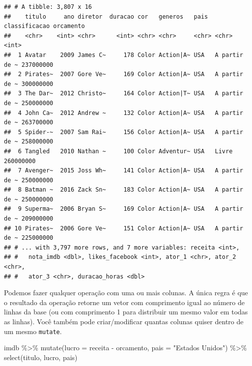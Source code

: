 \documentclass[
]{book}
\newenvironment{Shaded}{\begin{snugshade}}{\end{snugshade}}
\newcommand{\AttributeTok}[1]{\textcolor[rgb]{0.77,0.63,0.00}{#1}}
\newcommand{\FunctionTok}[1]{\textcolor[rgb]{0.00,0.00,0.00}{#1}}
\newcommand{\NormalTok}[1]{#1}
\newcommand{\SpecialCharTok}[1]{\textcolor[rgb]{0.00,0.00,0.00}{#1}}
\newcommand{\StringTok}[1]{\textcolor[rgb]{0.31,0.60,0.02}{#1}}
\begin{document}
\begin{verbatim}
## # A tibble: 3,807 x 16
##    titulo     ano diretor  duracao cor   generos   pais  classificacao orcamento
##    <chr>    <int> <chr>      <int> <chr> <chr>     <chr> <chr>             <int>
##  1 Avatar    2009 James C~     178 Color Action|A~ USA   A partir de ~ 237000000
##  2 Pirates~  2007 Gore Ve~     169 Color Action|A~ USA   A partir de ~ 300000000
##  3 The Dar~  2012 Christo~     164 Color Action|T~ USA   A partir de ~ 250000000
##  4 John Ca~  2012 Andrew ~     132 Color Action|A~ USA   A partir de ~ 263700000
##  5 Spider-~  2007 Sam Rai~     156 Color Action|A~ USA   A partir de ~ 258000000
##  6 Tangled   2010 Nathan ~     100 Color Adventur~ USA   Livre         260000000
##  7 Avenger~  2015 Joss Wh~     141 Color Action|A~ USA   A partir de ~ 250000000
##  8 Batman ~  2016 Zack Sn~     183 Color Action|A~ USA   A partir de ~ 250000000
##  9 Superma~  2006 Bryan S~     169 Color Action|A~ USA   A partir de ~ 209000000
## 10 Pirates~  2006 Gore Ve~     151 Color Action|A~ USA   A partir de ~ 225000000
## # ... with 3,797 more rows, and 7 more variables: receita <int>,
## #   nota_imdb <dbl>, likes_facebook <int>, ator_1 <chr>, ator_2 <chr>,
## #   ator_3 <chr>, duracao_horas <dbl>
\end{verbatim}

Podemos fazer qualquer operação com uma ou mais colunas. A única regra é que o resultado da operação retorne um vetor com comprimento igual ao número de linhas da base (ou com comprimento 1 para distribuir um mesmo valor em todas as linhas). Você também pode criar/modificar quantas colunas quiser dentro de um mesmo \texttt{mutate}.

\begin{Shaded}
\begin{Highlighting}[]
\NormalTok{imdb }\SpecialCharTok{\%\textgreater{}\%} 
  \FunctionTok{mutate}\NormalTok{(}\AttributeTok{lucro =}\NormalTok{ receita }\SpecialCharTok{{-}}\NormalTok{ orcamento, }\AttributeTok{pais =} \StringTok{"Estados Unidos"}\NormalTok{) }\SpecialCharTok{\%\textgreater{}\%} 
  \FunctionTok{select}\NormalTok{(titulo, lucro, pais)}
\end{Highlighting}
\end{Shaded}
\end{document}
